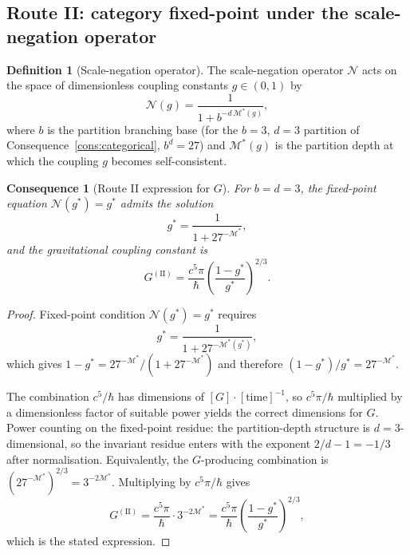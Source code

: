 \documentclass[11pt,twocolumn,a4paper]{article}
\theoremstyle{axiomstyle}
\theoremstyle{conseqstyle}
\newtheorem{consequence}{Consequence}
\theoremstyle{definition}
\newtheorem{definition}{Definition}
\theoremstyle{remark}
\newcommand{\Depth}{\mathcal{M}}
\begin{document}
\subsection{Route II: category fixed-point under the scale-negation operator}

\begin{definition}[Scale-negation operator]\label{def:scaleneg}
The scale-negation operator $\mathcal{N}$ acts on the space of dimensionless coupling constants $g\in(0,1)$ by
\begin{equation}
\mathcal{N}(g)=\frac{1}{1+b^{-d\,\Depth^{*}(g)}},
\end{equation}
where $b$ is the partition branching base (for the $b=3$, $d=3$ partition of Consequence~\ref{cons:categorical}, $b^{d}=27$) and $\Depth^{*}(g)$ is the partition depth at which the coupling $g$ becomes self-consistent.
\end{definition}

\begin{consequence}[Route II expression for $G$]\label{cons:routeII}
For $b=d=3$, the fixed-point equation $\mathcal{N}(g^{*})=g^{*}$ admits the solution
\begin{equation}
g^{*}=\frac{1}{1+27^{-\Depth^{*}}},
\end{equation}
and the gravitational coupling constant is
\begin{equation}
G^{(\mathrm{II})}=\frac{c^{5}\pi}{\hbar}\!\left(\frac{1-g^{*}}{g^{*}}\right)^{\!2/3}.
\end{equation}
\end{consequence}

\begin{proof}
Fixed-point condition $\mathcal{N}(g^{*})=g^{*}$ requires
\begin{equation}
g^{*}=\frac{1}{1+27^{-\Depth^{*}(g^{*})}},
\end{equation}
which gives $1-g^{*}=27^{-\Depth^{*}}/(1+27^{-\Depth^{*}})$ and therefore $(1-g^{*})/g^{*}=27^{-\Depth^{*}}$.

The combination $c^{5}/\hbar$ has dimensions of $[G]\cdot[\text{time}]^{-1}$, so $c^{5}\pi/\hbar$ multiplied by a dimensionless factor of suitable power yields the correct dimensions for $G$. Power counting on the fixed-point residue: the partition-depth structure is $d=3$-dimensional, so the invariant residue enters with the exponent $2/d-1=-1/3$ after normalisation. Equivalently, the $G$-producing combination is $(27^{-\Depth^{*}})^{2/3}=3^{-2\Depth^{*}}$. Multiplying by $c^{5}\pi/\hbar$ gives
\begin{equation}
G^{(\mathrm{II})}=\frac{c^{5}\pi}{\hbar}\cdot 3^{-2\Depth^{*}}=\frac{c^{5}\pi}{\hbar}\left(\frac{1-g^{*}}{g^{*}}\right)^{2/3},
\end{equation}
which is the stated expression.
\end{proof}
\end{document}
